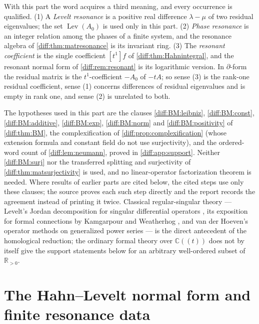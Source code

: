 \documentclass[11pt,letterpaper]{article}
\numberwithin{equation}{section}
\theoremstyle{definition}
\theoremstyle{remark}
\newcommand{\R}{\mathbb R}
\newcommand{\C}{\mathbb C}
\newcommand{\der}{\partial}
\newcommand{\Lev}{\operatorname{Lev}}
\begin{document}
\begin{warning}
\label{diff:rs:warn:resonance}
With this part the word acquires a third meaning, and every occurrence is
qualified.
(1) A \emph{Levelt resonance} is a positive real difference $\lambda-\mu$ of
two residual eigenvalues; the set $\Lev(A_{0})$ is used only in this part.
(2) \emph{Phase resonance} is an integer relation among the phases of a finite
system, and the resonance algebra of \cref{diff:thm:matresonance} is its
invariant ring.
(3) The \emph{resonant coefficient} is the single coefficient $[t^{1}]f$ of
\cref{diff:thm:Hahnintegral}, and the resonant normal form of
\cref{diff:rem:resonant} is its logarithmic version. In $\der$-form the residual
matrix is the $t^{1}$-coefficient $-A_{0}$ of $-tA$; so sense (3) is the
rank-one residual coefficient, sense (1) concerns differences of residual
eigenvalues and is empty in rank one, and sense (2) is unrelated to both.
\end{warning}

\begin{remark}
\label{diff:rs:rem:imports}
The hypotheses used in this part are the clauses \ref{diff:BM:leibniz},
\ref{diff:BM:const}, \ref{diff:BM:additive}, \ref{diff:BM:exp},
\ref{diff:BM:norm} and \ref{diff:BM:positivity} of \cref{diff:thm:BM}, the
complexification of \cref{diff:prop:complexification} (whose extension formula
and constant field do not use surjectivity), and the ordered-word count of
\cref{diff:lem:neumann}, proved in \cref{diff:app:support}. Neither
\ref{diff:BM:surj} nor the transferred splitting and surjectivity of
\cref{diff:thm:matsurjectivity} is used, and no linear-operator factorization
theorem is needed. Where results of earlier parts are cited below, the cited
steps use only these clauses; the source proves each such step directly and
the report records the agreement instead of printing it twice. Classical
regular-singular theory --- Levelt's Jordan decomposition for singular
differential operators \cite{Levelt}, its exposition for formal connections
by Kamgarpour and Weatherhog \cite{KW}, and van der Hoeven's operator methods
on generalized power series \cite{vdH} --- is the direct antecedent of the
homological reduction; the ordinary formal theory over $\C((t))$ does not by
itself give the support statements below for an arbitrary well-ordered subset
of $\R_{>0}$.
\end{remark}

\section{The Hahn--Levelt normal form and finite resonance data}
\label{diff:rs:sec:normal}
\end{document}
